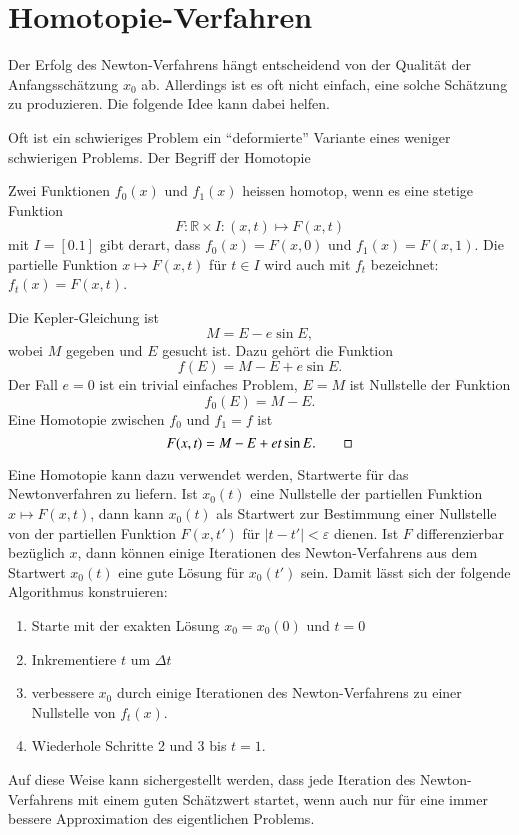 %
%
%
\section{Homotopie-Verfahren
\label{buch:section:homotopie}}
Der Erfolg des Newton-Verfahrens hängt entscheidend von der Qualität der
Anfangsschätzung $x_0$ ab.
Allerdings ist es oft nicht einfach, eine solche Schätzung zu produzieren.
Die folgende Idee kann dabei helfen.

Oft ist ein schwieriges Problem ein ``deformierte'' Variante eines
weniger schwierigen Problems.
Der Begriff der Homotopie 

\begin{definition}
Zwei Funktionen $f_0(x)$ und $f_1(x)$ heissen homotop, wenn es
eine stetige Funktion
\[
F\colon \mathbb R\times I : (x,t)\mapsto F(x,t)
\]
mit $I=[0.1]$
gibt derart, dass $f_0(x)=F(x,0)$ und $f_1(x)=F(x,1)$.
Die partielle Funktion $x\mapsto F(x,t)$ für $t\in I$ wird auch mit
$f_t$ bezeichnet: $f_t(x)=F(x,t)$.
\end{definition}

\begin{beispiel}
Die Kepler-Gleichung ist 
\[
M=E-e\sin E,
\]
wobei $M$ gegeben und $E$ gesucht ist.
Dazu gehört die Funktion
\[
f(E)=M-E+e\sin E.
\]
Der Fall $e=0$ ist ein trivial einfaches Problem, $E=M$ ist Nullstelle
der Funktion
\[
f_0(E)=M-E.
\]
Eine Homotopie zwischen $f_0$ und $f_1=f$ ist
\[
F(x,t) = M-E+et\sin E.
\qedhere
\]
\end{beispiel}

Eine Homotopie kann dazu verwendet werden, Startwerte für das Newtonverfahren
zu liefern.
Ist $x_0(t)$ eine Nullstelle der partiellen Funktion $x\mapsto F(x,t)$,
dann kann $x_0(t)$ als Startwert zur Bestimmung einer Nullstelle von
der partiellen Funktion $F(x,t')$ für $|t-t'|<\varepsilon$ dienen.
Ist $F$ differenzierbar bezüglich $x$, dann können einige Iterationen
des Newton-Verfahrens aus dem Startwert $x_0(t)$ eine gute Lösung für
$x_0(t')$ sein.
Damit lässt sich der folgende Algorithmus konstruieren:

\begin{enumerate}
\item 
Starte mit der exakten Lösung $x_0=x_0(0)$ und $t=0$
\item
Inkrementiere $t$ um $\Delta t$
\item
verbessere $x_0$ durch einige Iterationen des Newton-Verfahrens
zu einer Nullstelle von $f_t(x)$.
\item 
Wiederhole Schritte 2 und 3 bis $t=1$.
\end{enumerate}
Auf diese Weise kann sichergestellt werden, dass jede Iteration
des Newton-Verfahrens mit einem guten Schätzwert startet, wenn auch
nur für eine immer bessere Approximation des eigentlichen Problems.







